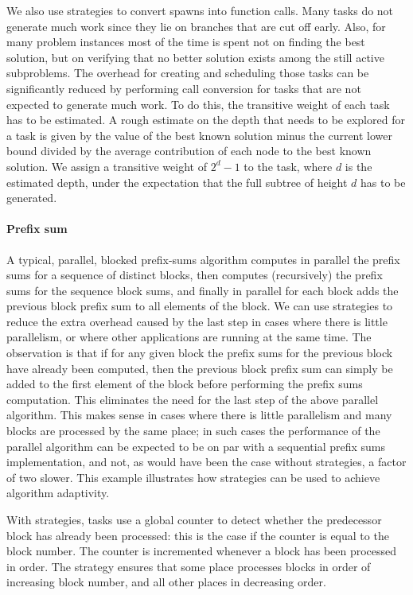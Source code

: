 \documentclass[a4paper,11pt]{article}
\begin{document}
We also use strategies to
convert spawns into function calls. Many tasks do not generate
much work since they lie on branches that are cut off early. Also, for
many problem instances most of the time is spent not on finding the
best solution, but on verifying that no better solution exists among
the still active subproblems. The overhead for creating and scheduling
those tasks can be significantly reduced by performing call conversion
for tasks that are not expected to generate much work. To do this, the
transitive weight of each task has to be estimated. A rough estimate
on the depth that needs to be explored for a task is given by the
value of the best known solution minus the current lower bound divided
by the average contribution of each node to the best known
solution.
We assign a transitive weight of $2^d-1$ to the task, where $d$
is the estimated depth, under the expectation that the full subtree of
height $d$ has to be generated.

\paragraph{Prefix sum}
\label{sec:prefix}

A typical, parallel, blocked prefix-sums algorithm computes in
parallel the prefix sums for a sequence of distinct blocks, then
computes (recursively) the prefix sums for the sequence block sums,
and finally in parallel for each block adds the previous block prefix
sum to all elements of the block. We can use strategies to reduce the
extra overhead caused by the last step in cases where there is little
parallelism, or where other applications are running at the same
time. The observation is that if for any given block the prefix sums
for the previous block have already been computed, then the previous
block prefix sum can simply be added to the first element of the block
before performing the prefix sums computation. This eliminates the
need for the last step of the above parallel algorithm. This makes
sense in cases where there is little parallelism and many blocks are
processed by the same place; in such cases the performance of the
parallel algorithm can be expected to be on par with a sequential
prefix sums implementation, and not, as would have been the case
without strategies, a factor of two slower. This example illustrates
how strategies can be used to achieve algorithm adaptivity.

With strategies, tasks use a global counter to detect whether the
predecessor block has already been processed: this is the case if the
counter is equal to the block number. The counter is incremented
whenever a block has been processed in order. The strategy ensures
that some place processes blocks in order of increasing block number,
and all other places in decreasing order.
\end{document}

